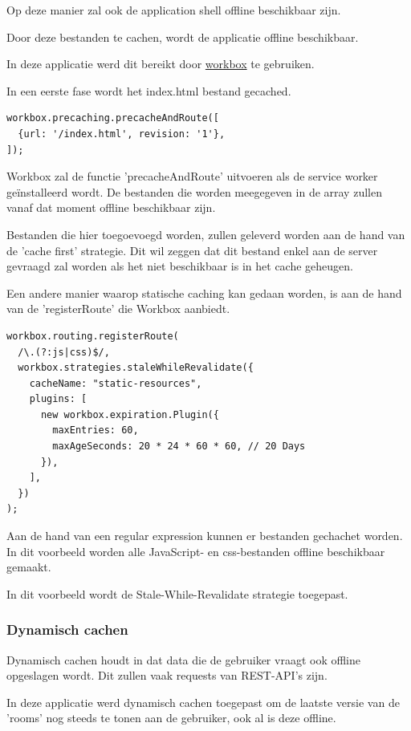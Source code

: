 			Op deze manier zal ook de application shell offline beschikbaar zijn.
			
			Door deze bestanden te cachen, wordt de applicatie offline beschikbaar.
			
			In deze applicatie werd dit bereikt door \href{https://developers.google.com/web/tools/workbox}{workbox} te gebruiken.
			
			In een eerste fase wordt het index.html bestand gecached.
\begin{lstlisting}
workbox.precaching.precacheAndRoute([
  {url: '/index.html', revision: '1'},
]);
\end{lstlisting}
		
			Workbox zal de functie 'precacheAndRoute' uitvoeren als de service worker geïnstalleerd wordt. De bestanden die worden meegegeven in de array zullen vanaf dat moment offline beschikbaar zijn.
			\autocite{Workbox2020a}
			
			Bestanden die hier toegoevoegd worden, zullen geleverd worden aan de hand van de 'cache first' strategie. Dit wil zeggen dat dit bestand enkel aan de server gevraagd zal worden als het niet beschikbaar is in het cache geheugen.
			
			Een andere manier waarop statische caching kan gedaan worden, is aan de hand van de 'registerRoute' die Workbox aanbiedt. 
			
\begin{lstlisting}
workbox.routing.registerRoute(
  /\.(?:js|css)$/,
  workbox.strategies.staleWhileRevalidate({
    cacheName: "static-resources",
    plugins: [
      new workbox.expiration.Plugin({
        maxEntries: 60,
        maxAgeSeconds: 20 * 24 * 60 * 60, // 20 Days
      }),
    ],
  })
);
\end{lstlisting}
			
			Aan de hand van een regular expression kunnen er bestanden gechachet worden. In dit voorbeeld worden alle JavaScript- en css-bestanden offline beschikbaar gemaakt.
			
			In dit voorbeeld wordt de Stale-While-Revalidate strategie toegepast.
			\autocite{Workbox2020b}
			
		\subsubsection{Dynamisch cachen}
			Dynamisch cachen houdt in dat data die de gebruiker vraagt ook offline opgeslagen wordt. Dit zullen vaak requests van REST-API's zijn.
			
			In deze applicatie werd dynamisch cachen toegepast om de laatste versie van de 'rooms' nog steeds te tonen aan de gebruiker, ook al is deze offline.
			

